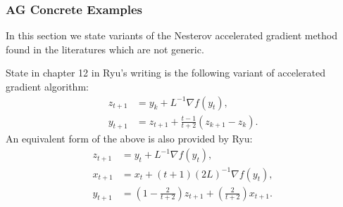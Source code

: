 \documentclass[12pt]{article}
\begin{document}
        \subsubsection{AG Concrete Examples}
            In this section we state variants of the Nesterov accelerated gradient method found in the literatures which are not generic. 
            
            \begin{definition}[AG Ryu 12.1]
            \label{def:ag_ryu_12.1}
                State in chapter 12 in Ryu's writing \cite{ryu_large-scale_2022} is the following variant of accelerated gradient algorithm: 
                \begin{align*}
                    z_{t + 1} &= y_k + L^{-1}\nabla f(y_t), 
                    \\
                    y_{t + 1} &= z_{t + 1} + \frac{t - 1}{t + 2}\left(
                        z_{k + 1} - z_k
                    \right). 
                \end{align*}
                An equivalent form of the above is also provided by Ryu: 
                \begin{align*}
                    z_{t + 1} &= y_t + L^{-1}\nabla f(y_t), 
                    \\
                    x_{t + 1} &= x_t + (t + 1)(2L)^{-1}\nabla f(y_t), 
                    \\
                    y_{t + 1} &= \left(
                        1 - \frac{2}{t + 2} 
                    \right)z_{t + 1} + 
                    \left(
                        \frac{2}{t + 2}
                    \right)x_{t + 1}. 
                \end{align*}
            \end{definition}
\end{document}
